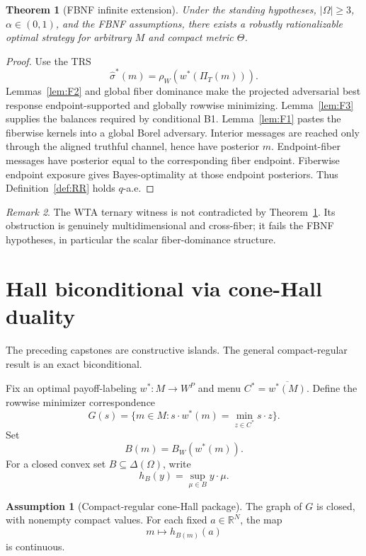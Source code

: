 \documentclass[11pt]{article}
\newtheorem{theorem}{Theorem}
\theoremstyle{definition}
\newtheorem{assumption}{Assumption}
\theoremstyle{remark}
\newtheorem{remark}[theorem]{Remark}
\newcommand{\R}{\mathbb{R}}
\newcommand{\Om}{\Omega}
\begin{document}
\begin{theorem}[FBNF infinite extension]\label{thm:FBNF}
Under the standing hypotheses, $|\Om|\ge3$, $\alpha\in(0,1)$, and the FBNF assumptions, there exists a robustly rationalizable optimal strategy for arbitrary $M$ and compact metric $\Theta$.
\end{theorem}

\begin{proof}
Use the TRS
\[
  \hat\sigma^*(m)=\rho_W(w^*(\Pi_T(m))).
\]
Lemmas~\ref{lem:F2} and global fiber dominance make the projected adversarial best response endpoint-supported and globally rowwise minimizing. Lemma~\ref{lem:F3} supplies the balances required by conditional B1. Lemma~\ref{lem:F1} pastes the fiberwise kernels into a global Borel adversary. Interior messages are reached only through the aligned truthful channel, hence have posterior $m$. Endpoint-fiber messages have posterior equal to the corresponding fiber endpoint. Fiberwise endpoint exposure gives Bayes-optimality at those endpoint posteriors. Thus Definition~\ref{def:RR} holds $q$-a.e.
\end{proof}

\begin{remark}
The WTA ternary witness is not contradicted by Theorem~\ref{thm:FBNF}. Its obstruction is genuinely multidimensional and cross-fiber; it fails the FBNF hypotheses, in particular the scalar fiber-dominance structure.
\end{remark}

\section{Hall biconditional via cone-Hall duality}\label{sec:hall}

The preceding capstones are constructive islands. The general compact-regular result is an exact biconditional.

Fix an optimal payoff-labeling $w^*:M\to W^P$ and menu $C^*=\overline{w^*(M)}$. Define the rowwise minimizer correspondence
\begin{equation}\label{eq:Gcorr}
  G(s)=\{m\in M: s\cdot w^*(m)=\min_{z\in C^*}s\cdot z\}.
\end{equation}
Set
\[
  B(m)=B_W(w^*(m)).
\]
For a closed convex set $B\subseteq\Delta(\Om)$, write
\[
  h_B(y)=\sup_{\mu\in B}y\cdot\mu.
\]

\begin{assumption}[Compact-regular cone-Hall package]\label{ass:reg}
The graph of $G$ is closed, with nonempty compact values. For each fixed $a\in\R^N$, the map
\[
  m\mapsto h_{B(m)}(a)
\]
is continuous.
\end{assumption}
\end{document}
